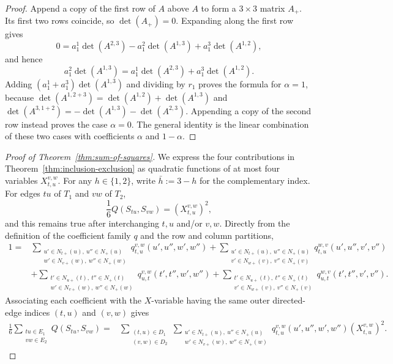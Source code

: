 \documentclass[pdflatex,sn-mathphys-num]{sn-jnl}
\theoremstyle{thmstyleone}
\begin{document}
\begin{proof}
Append a copy of the first row of $A$ above $A$ to form a $3\times3$
matrix $A_+$.  Its first two rows coincide, so $\det(A_+)=0$.  Expanding
along the first row gives
\[
0=a_1^1\det(A^{2,3})-a_1^2\det(A^{1,3})+a_1^3\det(A^{1,2}),
\]
and hence
\[
a_1^2\det(A^{1,3})=a_1^1\det(A^{2,3})+a_1^3\det(A^{1,2}).
\]
Adding $(a_1^1+a_1^3)\det(A^{1,3})$ and dividing by $r_1$ proves the
formula for $\alpha=1$, because
$\det(A^{1,2+3})=\det(A^{1,2})+\det(A^{1,3})$ and
$\det(A^{3,1+2})=-\det(A^{1,3})-\det(A^{2,3})$.  Appending a copy of the second
row instead proves the case $\alpha=0$.  The general identity is the
linear combination of these two cases with coefficients $\alpha$ and
$1-\alpha$.
\end{proof}

\begin{proof}[Proof of Theorem~\ref{thm:sum-of-squares}]
We express the four contributions in Theorem~\ref{thm:inclusion-exclusion}
as quadratic functions of at most four variables $X_{t,u}^{v,w}$.
For any $h\in\{1,2\}$, write $\bar h:=3-h$ for the complementary index.
For edges $tu$ of $T_1$ and $vw$ of $T_2$,
\[
\frac16Q(S_{tu},S_{vw})=(X_{t,u}^{v,w})^2,
\]
and this remains true after interchanging $t,u$ and/or $v,w$.  Directly
from the definition of the coefficient family $q$ and the row and column
partitions,
\begin{align*}
1={}&
\sum_{\substack{u'\in N_{t+}(u),\ u''\in N_+(u)\\
w'\in N_{v+}(w),\ w''\in N_+(w)}}
q_{t,u}^{v,w}(u',u'',w',w'')
+\sum_{\substack{u'\in N_{t+}(u),\ u''\in N_+(u)\\
v'\in N_{w+}(v),\ v''\in N_+(v)}}
q_{t,u}^{w,v}(u',u'',v',v'')\\
&+\sum_{\substack{t'\in N_{u+}(t),\ t''\in N_+(t)\\
w'\in N_{v+}(w),\ w''\in N_+(w)}}
q_{u,t}^{v,w}(t',t'',w',w'')
+\sum_{\substack{t'\in N_{u+}(t),\ t''\in N_+(t)\\
v'\in N_{w+}(v),\ v''\in N_+(v)}}
q_{u,t}^{w,v}(t',t'',v',v'').
\end{align*}
Associating each coefficient with the $X$-variable having the same outer
directed-edge indices $(t,u)$ and $(v,w)$ gives
\begin{align}
\frac16\sum_{\substack{tu\in E_1\\vw\in E_2}}Q(S_{tu},S_{vw})
={}&\sum_{\substack{(t,u)\in D_1\\(v,w)\in D_2}}
\sum_{\substack{u'\in N_{t+}(u),\ u''\in N_+(u)\\
w'\in N_{v+}(w),\ w''\in N_+(w)}}
q_{t,u}^{v,w}(u',u'',w',w'')
(X_{t,u}^{v,w})^2.                                      \label{eq:edge-edge}
\end{align}


\end{proof}
\end{document}
